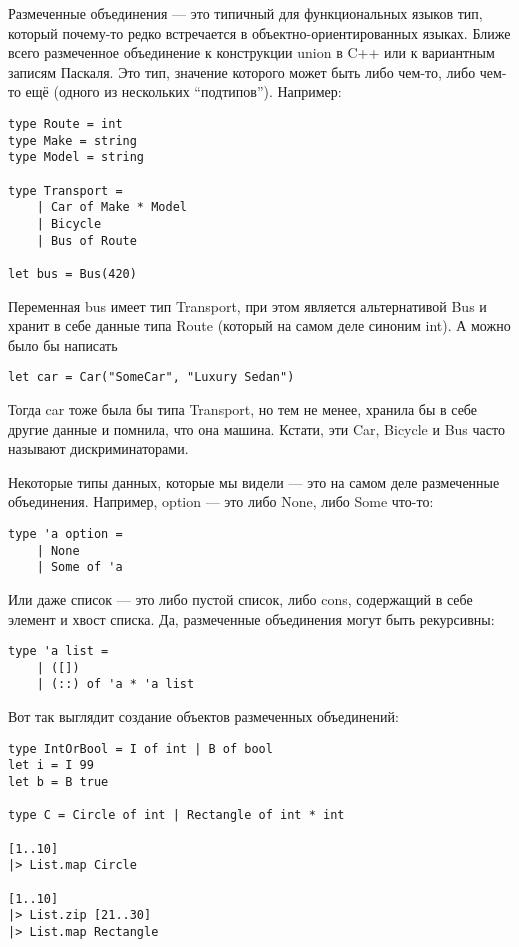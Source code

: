 \documentclass[a5paper]{article}
\begin{document}
Размеченные объединения --- это типичный для функциональных языков тип, который почему-то редко встречается в объектно-ориентированных языках. Ближе всего размеченное объединение к конструкции union в C++ или к вариантным записям Паскаля. Это тип, значение которого может быть либо чем-то, либо чем-то ещё (одного из нескольких ``подтипов''). Например:

\begin{verbatim}
type Route = int
type Make = string
type Model = string

type Transport =
    | Car of Make * Model
    | Bicycle
    | Bus of Route

let bus = Bus(420)
\end{verbatim}

Переменная bus имеет тип Transport, при этом является альтернативой Bus и хранит в себе данные типа Route (который на самом деле синоним int). А можно было бы написать

\begin{verbatim}
let car = Car("SomeCar", "Luxury Sedan")
\end{verbatim}

Тогда car тоже была бы типа Transport, но тем не менее, хранила бы в себе другие данные и помнила, что она машина. Кстати, эти Car, Bicycle и Bus часто называют дискриминаторами.

Некоторые типы данных, которые мы видели --- это на самом деле размеченные объединения. Например, option --- это либо None, либо Some что-то:

\begin{verbatim}
type 'a option =
    | None
    | Some of 'a
\end{verbatim}

Или даже список --- это либо пустой список, либо cons, содержащий в себе элемент и хвост списка. Да, размеченные объединения могут быть рекурсивны:

\begin{verbatim}
type 'a list =
    | ([])
    | (::) of 'a * 'a list
\end{verbatim}

Вот так выглядит создание объектов размеченных объединений:

\begin{verbatim}
type IntOrBool = I of int | B of bool
let i = I 99
let b = B true

type C = Circle of int | Rectangle of int * int

[1..10]
|> List.map Circle

[1..10]
|> List.zip [21..30]
|> List.map Rectangle
\end{verbatim}
\end{document}
